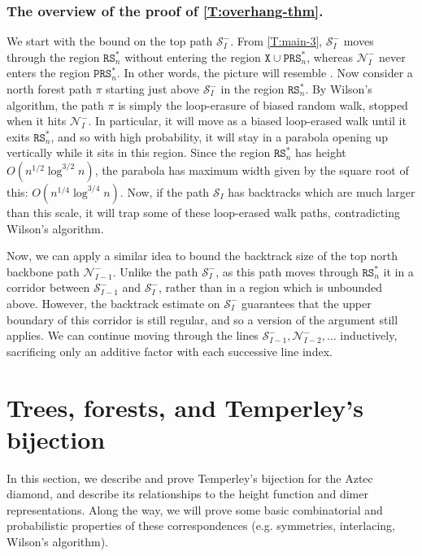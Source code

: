 \documentclass[11pt,twoside]{amsart}
\theoremstyle{plain}
\numberwithin{quest}{section}
\theoremstyle{remark}
\numberwithin{rem}{section}
\theoremstyle{definition}
\newcommand{\cS}{\mathcal{S}}
\newcommand{\cN}{\mathcal{N}}
\renewcommand{\tt}[1]{{\mathtt{#1}}}
\begin{document}
\subsubsection*{The overview of the proof of \cref{T:overhang-thm}.} \qquad We start with the bound on the top path $\cS_I^-$. From \cref{T:main-3}, $\cS_I^-$ moves through the region $\tt{RS}_n^*$ without entering the region $\tt{X} \cup \tt{PRS}_n^*$, whereas $\cN_I^-$ never enters the region $\tt{PRS}_n^*$. In other words, the picture will resemble . Now consider a north forest path $\pi$ starting just above $\cS_I^-$ in the region $\tt{RS}_n^*$. By Wilson's algorithm, the path $\pi$ is simply the loop-erasure of biased random walk, stopped when it hits $\cN_I^-$. In particular, it will move as a biased loop-erased walk until it exits $\tt{RS}_n^*$, and so with high probability, it will stay in a parabola opening up vertically while it sits in this region. Since the region $\tt{RS}_n^*$ has height $O(n^{1/2} \log^{3/2} n)$, the parabola has maximum width given by the square root of this: $O(n^{1/4} \log^{3/4} n)$. Now, if the path $\cS_I$ has backtracks which are much larger than this scale, it will trap some of these loop-erased walk paths, contradicting Wilson's algorithm. 
	
	Now, we can apply a similar idea to bound the backtrack size of the top north backbone path $\cN_{I-1}^-$. Unlike the path $\cS_I^-$, as this path moves through $\tt{RS}_n^*$ it in a corridor between $\cS_{I-1}^-$ and $\cS_I^-$, rather than in a region which is unbounded above. However, the backtrack estimate on $\cS_I^-$ guarantees that the upper boundary of this corridor is still regular, and so a version of the argument still applies. We can continue moving through the lines $\cS_{I - 1}^-, \cN_{I-2}^-, \dots$ inductively, sacrificing only an additive factor with each successive line index. 
	
	
	
	
	\section{Trees, forests, and Temperley's bijection}
	\label{S:trees}
	In this section, we describe and prove Temperley's bijection for the Aztec diamond, and describe its relationships to the height function and dimer representations. Along the way, we will prove some basic combinatorial and probabilistic properties of these correspondences (e.g. symmetries, interlacing, Wilson's algorithm).
	
\end{document}
